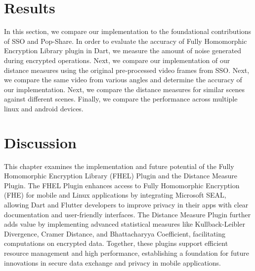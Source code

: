 \documentclass [11pt, proquest] {uwthesis}[2020/02/24]
\begin{document}





\chapter{Results}

In this section, we compare our implementation to the foundational contributions of SSO and Pop-Share. In order to evaluate the accuracy of Fully Homomorphic Encryption Library plugin in Dart, we measure the amount of noise generated during encrypted operations. Next, we compare our implementation of our distance measures using the original pre-processed video frames from SSO. Next, we compare the same video from various angles and determine the accuracy of our implementation. Next, we compare the distance measures for similar scenes against different scenes. Finally, we compare the performance across multiple linux and android devices.








\chapter{Discussion}

This chapter examines the implementation and future potential of the Fully Homomorphic Encryption Library (FHEL) Plugin and the Distance Measure Plugin. The FHEL Plugin enhances access to Fully Homomorphic Encryption (FHE) for mobile and Linux applications by integrating Microsoft SEAL, allowing Dart and Flutter developers to improve privacy in their apps with clear documentation and user-friendly interfaces. The Distance Measure Plugin further adds value by implementing advanced statistical measures like Kullback-Leibler Divergence, Cramer Distance, and Bhattacharyya Coefficient, facilitating computations on encrypted data. Together, these plugins support efficient resource management and high performance, establishing a foundation for future innovations in secure data exchange and privacy in mobile applications.




\end{document}
